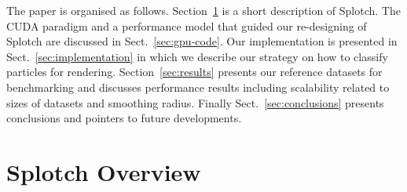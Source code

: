 \documentclass[smallextended]{svjour3}
\begin{document}
The paper is organised as follows. 
Section~\ref{sec:overview} is a short description of Splotch. The CUDA paradigm and a performance model that guided our re-designing of Splotch are discussed in Sect.~\ref{sec:gpu-code}. Our implementation is presented in Sect.~\ref{sec:implementation} in which we describe our strategy on how to classify particles for rendering. Section~\ref{sec:results} presents our reference datasets for benchmarking and discusses performance results including scalability related to sizes of datasets and smoothing radius. Finally Sect.~\ref{sec:conclusions} presents conclusions and pointers to future developments.

\section{Splotch Overview}
\label{sec:overview}
\end{document}
